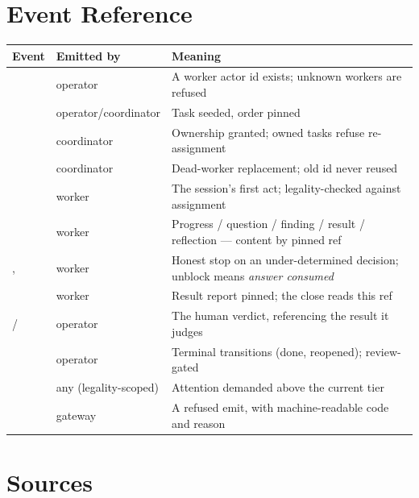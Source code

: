 \section{Event Reference}

\small
\begin{center}
\begin{tabular}{@{}llL{62mm}@{}}
\toprule
\textbf{Event} & \textbf{Emitted by} & \textbf{Meaning} \\
\midrule
{} & operator & A worker actor id exists; unknown workers are refused \\
 & operator/coordinator & Task seeded, order pinned \\
 & coordinator & Ownership granted; owned tasks refuse re-assignment \\
 & coordinator & Dead-worker replacement; old id never reused \\
 & worker & The session's first act; legality-checked against assignment \\
 & worker & Progress / question / finding / result / reflection --- content by pinned ref \\
,  & worker & Honest stop on an under-determined decision; unblock means \emph{answer consumed} \\
 & worker & Result report pinned; the close reads this ref \\
 /  & operator & The human verdict, referencing the result it judges \\
 & operator & Terminal transitions (done, reopened); review-gated \\
 & any (legality-scoped) & Attention demanded above the current tier \\
 & gateway & A refused emit, with machine-readable code and reason \\
\bottomrule
\end{tabular}
\end{center}
\normalsize

\section{Sources}

